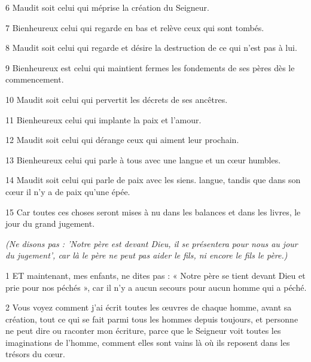 \par 6 Maudit soit celui qui méprise la création du Seigneur.

\par 7 Bienheureux celui qui regarde en bas et relève ceux qui sont tombés.

\par 8 Maudit soit celui qui regarde et désire la destruction de ce qui n'est pas à lui.

\par 9 Bienheureux est celui qui maintient fermes les fondements de ses pères dès le commencement.

\par 10 Maudit soit celui qui pervertit les décrets de ses ancêtres.

\par 11 Bienheureux celui qui implante la paix et l'amour.

\par 12 Maudit soit celui qui dérange ceux qui aiment leur prochain.

\par 13 Bienheureux celui qui parle à tous avec une langue et un cœur humbles.

\par 14 Maudit soit celui qui parle de paix avec les siens. langue, tandis que dans son cœur il n'y a de paix qu'une épée.

\par 15 Car toutes ces choses seront mises à nu dans les balances et dans les livres, le jour du grand jugement.


\par \textit{(Ne disons pas : 'Notre père est devant Dieu, il se présentera pour nous au jour du jugement', car là le père ne peut pas aider le fils, ni encore le fils le père.)}

\par 1 ET maintenant, mes enfants, ne dites pas : « Notre père se tient devant Dieu et prie pour nos péchés », car il n'y a aucun secours pour aucun homme qui a péché.

\par 2 Vous voyez comment j'ai écrit toutes les œuvres de chaque homme, avant sa création, tout ce qui se fait parmi tous les hommes depuis toujours, et personne ne peut dire ou raconter mon écriture, parce que le Seigneur voit toutes les imaginations de l'homme, comment elles sont vains là où ils reposent dans les trésors du cœur.

